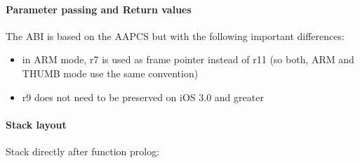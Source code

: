 \paragraph{Parameter passing and Return values}

The ABI is based on the AAPCS but with the following important differences:

\begin{itemize}
\item in ARM mode, r7 is used as frame pointer instead of r11 (so both, ARM and THUMB mode use the same convention)
\item r9 does not need to be preserved on iOS 3.0 and greater
\end{itemize}


\paragraph{Stack layout}

Stack directly after function prolog:\\

